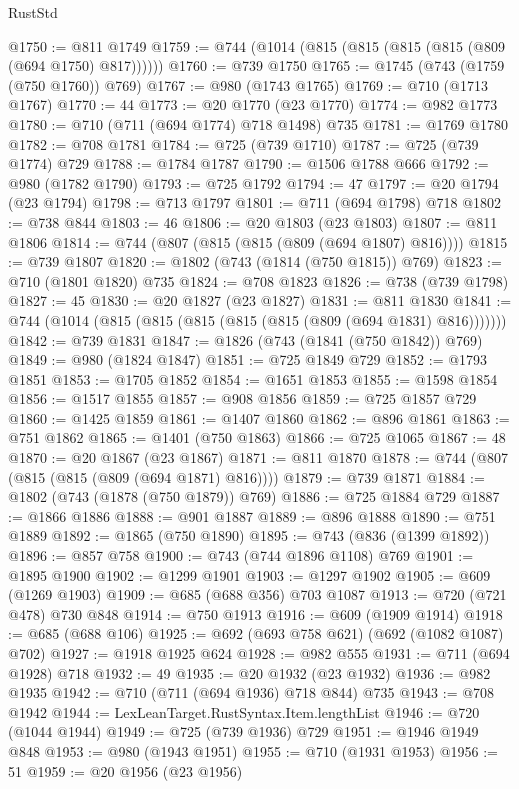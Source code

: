 \begin{lexlean}{RustStd}
\begin{coremodule}
@1750 := @811 @1749
@1759 := @744 (@1014 (@815 (@815 (@815 (@815 (@809 (@694 @1750) @817))))))
@1760 := @739 @1750
@1765 := @1745 (@743 (@1759 (@750 @1760)) @769)
@1767 := @980 (@1743 @1765)
@1769 := @710 (@1713 @1767)
@1770 := 44
@1773 := @20 @1770 (@23 @1770)
@1774 := @982 @1773
@1780 := @710 (@711 (@694 @1774) @718 @1498) @735
@1781 := @1769 @1780
@1782 := @708 @1781
@1784 := @725 (@739 @1710)
@1787 := @725 (@739 @1774) @729
@1788 := @1784 @1787
@1790 := @1506 @1788 @666
@1792 := @980 (@1782 @1790)
@1793 := @725 @1792
@1794 := 47
@1797 := @20 @1794 (@23 @1794)
@1798 := @713 @1797
@1801 := @711 (@694 @1798) @718
@1802 := @738 @844
@1803 := 46
@1806 := @20 @1803 (@23 @1803)
@1807 := @811 @1806
@1814 := @744 (@807 (@815 (@815 (@809 (@694 @1807) @816))))
@1815 := @739 @1807
@1820 := @1802 (@743 (@1814 (@750 @1815)) @769)
@1823 := @710 (@1801 @1820) @735
@1824 := @708 @1823
@1826 := @738 (@739 @1798)
@1827 := 45
@1830 := @20 @1827 (@23 @1827)
@1831 := @811 @1830
@1841 := @744 (@1014 (@815 (@815 (@815 (@815 (@815 (@809 (@694 @1831) @816)))))))
@1842 := @739 @1831
@1847 := @1826 (@743 (@1841 (@750 @1842)) @769)
@1849 := @980 (@1824 @1847)
@1851 := @725 @1849 @729
@1852 := @1793 @1851
@1853 := @1705 @1852
@1854 := @1651 @1853
@1855 := @1598 @1854
@1856 := @1517 @1855
@1857 := @908 @1856
@1859 := @725 @1857 @729
@1860 := @1425 @1859
@1861 := @1407 @1860
@1862 := @896 @1861
@1863 := @751 @1862
@1865 := @1401 (@750 @1863)
@1866 := @725 @1065
@1867 := 48
@1870 := @20 @1867 (@23 @1867)
@1871 := @811 @1870
@1878 := @744 (@807 (@815 (@815 (@809 (@694 @1871) @816))))
@1879 := @739 @1871
@1884 := @1802 (@743 (@1878 (@750 @1879)) @769)
@1886 := @725 @1884 @729
@1887 := @1866 @1886
@1888 := @901 @1887
@1889 := @896 @1888
@1890 := @751 @1889
@1892 := @1865 (@750 @1890)
@1895 := @743 (@836 (@1399 @1892))
@1896 := @857 @758
@1900 := @743 (@744 @1896 @1108) @769
@1901 := @1895 @1900
@1902 := @1299 @1901
@1903 := @1297 @1902
@1905 := @609 (@1269 @1903)
@1909 := @685 (@688 @356) @703 @1087
@1913 := @720 (@721 @478) @730 @848
@1914 := @750 @1913
@1916 := @609 (@1909 @1914)
@1918 := @685 (@688 @106)
@1925 := @692 (@693 @758 @621) (@692 (@1082 @1087) @702)
@1927 := @1918 @1925 @624
@1928 := @982 @555
@1931 := @711 (@694 @1928) @718
@1932 := 49
@1935 := @20 @1932 (@23 @1932)
@1936 := @982 @1935
@1942 := @710 (@711 (@694 @1936) @718 @844) @735
@1943 := @708 @1942
@1944 := LexLeanTarget.RustSyntax.Item.lengthList
@1946 := @720 (@1044 @1944)
@1949 := @725 (@739 @1936) @729
@1951 := @1946 @1949 @848
@1953 := @980 (@1943 @1951)
@1955 := @710 (@1931 @1953)
@1956 := 51
@1959 := @20 @1956 (@23 @1956)

\end{coremodule}
\end{lexlean}
